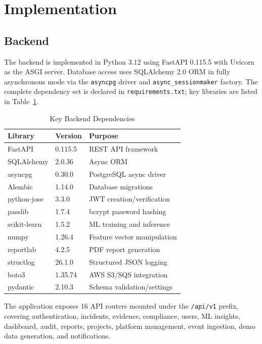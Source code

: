 \documentclass[conference]{IEEEtran}
\begin{document}
\section{Implementation}

\subsection{Backend}

The backend is implemented in Python 3.12 using FastAPI 0.115.5 with Uvicorn as the ASGI server. Database access uses SQLAlchemy 2.0 ORM in fully asynchronous mode via the \texttt{asyncpg} driver and \texttt{async\_sessionmaker} factory. The complete dependency set is declared in \texttt{requirements.txt}; key libraries are listed in Table~\ref{tab:deps}.

\begin{table}[h]
\caption{Key Backend Dependencies}
\label{tab:deps}
\centering
\begin{tabular}{@{}lll@{}}
\toprule
\textbf{Library} & \textbf{Version} & \textbf{Purpose} \\
\midrule
FastAPI       & 0.115.5  & REST API framework \\
SQLAlchemy    & 2.0.36   & Async ORM \\
asyncpg       & 0.30.0   & PostgreSQL async driver \\
Alembic       & 1.14.0   & Database migrations \\
python-jose   & 3.3.0    & JWT creation/verification \\
passlib       & 1.7.4    & bcrypt password hashing \\
scikit-learn  & 1.5.2    & ML training and inference \\
numpy         & 1.26.4   & Feature vector manipulation \\
reportlab     & 4.2.5    & PDF report generation \\
structlog     & 26.1.0   & Structured JSON logging \\
boto3         & 1.35.74  & AWS S3/SQS integration \\
pydantic      & 2.10.3   & Schema validation/settings \\
\bottomrule
\end{tabular}
\end{table}

The application exposes 16 API routers mounted under the \texttt{/api/v1} prefix, covering authentication, incidents, evidence, compliance, users, ML insights, dashboard, audit, reports, projects, platform management, event ingestion, demo data generation, and notifications.
\end{document}
